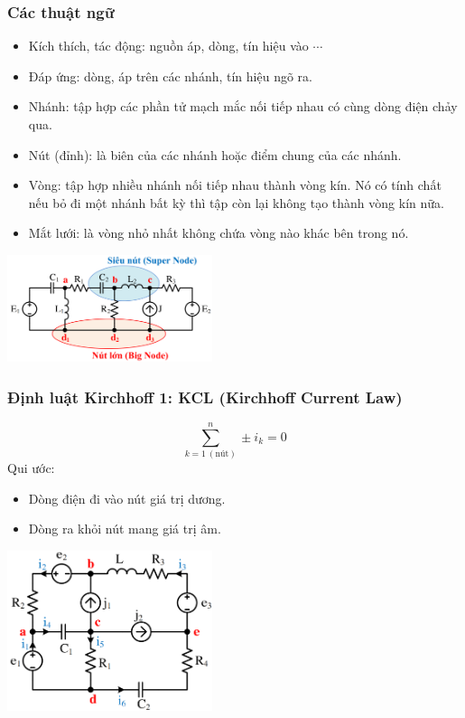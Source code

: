 \subsubsection{Các thuật ngữ}
\begin{itemize}
  \item Kích thích, tác động: nguồn áp, dòng, tín hiệu vào $\cdots$
  \item Đáp ứng: dòng, áp trên các nhánh, tín hiệu ngõ ra.
  \item Nhánh: tập hợp các phần tử mạch mắc nối tiếp nhau có cùng dòng điện chảy qua.
  \item Nút (đỉnh): là biên của các nhánh hoặc điểm chung của các nhánh.
  \item Vòng: tập hợp nhiều nhánh nối tiếp nhau thành vòng kín. Nó có tính chất nếu bỏ đi một nhánh bất kỳ thì tập còn lại không tạo thành vòng kín nữa.
  \item Mắt lưới: là vòng nhỏ nhất không chứa vòng nào khác bên trong nó.
\end{itemize}
\begin{center}
  \includegraphics[width = 0.45\textwidth]{./image/15.png}
\end{center}
\subsubsection{Định luật Kirchhoff 1: KCL (Kirchhoff Current Law)} 
\begin{equation}
  \sum_{k=1 \ (\text{nút})}^{n} \pm i_k = 0
\end{equation}
Qui ước:
\begin{itemize}
  \item Dòng điện đi vào nút giá trị dương.
  \item Dòng ra khỏi nút mang giá trị âm.
\end{itemize}
\begin{center}
  \includegraphics[width = 0.45\textwidth]{./image/16.png}
\end{center}
